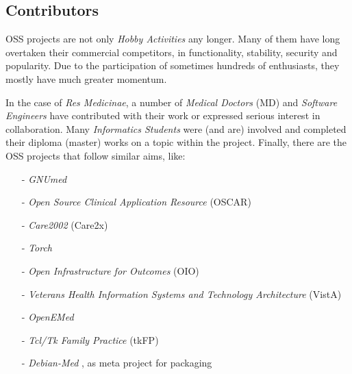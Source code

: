 %
%
%
%
%
%
%

\subsection{Contributors}
\label{contributors_heading}

OSS projects are not only \emph{Hobby Activities} any longer. Many of them have
long overtaken their commercial competitors, in functionality, stability,
security and popularity. Due to the participation of sometimes hundreds of
enthusiasts, they mostly have much greater momentum.

In the case of \emph{Res Medicinae}, a number of \emph{Medical Doctors} (MD)
and \emph{Software Engineers} have contributed with their work or expressed
serious interest in collaboration. Many \emph{Informatics Students} were (and
are) involved and completed their diploma (master) works on a topic within the
project. Finally, there are the OSS projects that follow similar aims, like:

\begin{itemize}
    \item[-] \emph{GNUmed} \cite{gnumed}
    \item[-] \emph{Open Source Clinical Application Resource} (OSCAR) \cite{oscar}
    \item[-] \emph{Care2002} (Care2x) \cite{care2x}
    \item[-] \emph{Torch} \cite{torch}
    \item[-] \emph{Open Infrastructure for Outcomes} (OIO) \cite{oio}
    \item[-] \emph{Veterans Health Information Systems and Technology Architecture} (VistA) \cite{vista}
    \item[-] \emph{OpenEMed} \cite{openemed}
    \item[-] \emph{Tcl/Tk Family Practice} (tkFP) \cite{openehr}
    \item[-] \emph{Debian-Med} \cite{debianmed}, as meta project for packaging
\end{itemize}

